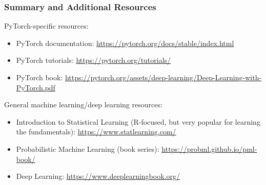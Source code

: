 \documentclass[xcolor={x11names,table}]{beamer}
\begin{document}
\begin{frame}
	\frametitle{Summary and Additional Resources}
	PyTorch-specific resources:
	\begin{itemize}
		\item PyTorch documentation: \url{https://pytorch.org/docs/stable/index.html}
		\item PyTorch tutorials: \url{https://pytorch.org/tutorials/}
		\item PyTorch book: \url{https://pytorch.org/assets/deep-learning/Deep-Learning-with-PyTorch.pdf}
	\end{itemize}
	
	General machine learning/deep learning resources:
	\begin{itemize}
		\item Introduction to Statistical Learning (R-focused, but very popular for learning the fundamentals): \url{https://www.statlearning.com/}
		\item Probabilistic Machine Learning (book series): \url{https://probml.github.io/pml-book/}
		\item Deep Learning: \url{https://www.deeplearningbook.org/}
	\end{itemize}
\end{frame}
\end{document}
